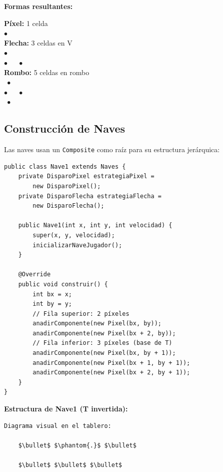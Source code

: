 \documentclass[12pt]{article}
\begin{document}
\textbf{Formas resultantes:}

\begin{center}
    \textbf{Píxel:} 1 celda\\
    $\bullet$\\[0.2cm]
    
    \textbf{Flecha:} 3 celdas en V\\
    $\bullet$\\
    $\bullet$ $\quad$ $\bullet$\\[0.2cm]
    
    \textbf{Rombo:} 5 celdas en rombo\\
    $\phantom{.}\bullet$\\
    $\bullet$ $\quad$ $\bullet$\\
    $\phantom{.}\bullet$\\
\end{center}

\subsection{Construcción de Naves}

Las naves usan un \texttt{Composite} como raíz para su estructura jerárquica:

\begin{lstlisting}
public class Nave1 extends Naves {
    private DisparoPixel estrategiaPixel = 
        new DisparoPixel();
    private DisparoFlecha estrategiaFlecha = 
        new DisparoFlecha();
    
    public Nave1(int x, int y, int velocidad) {
        super(x, y, velocidad);
        inicializarNaveJugador();
    }
    
    @Override
    public void construir() {
        int bx = x;
        int by = y;
        // Fila superior: 2 píxeles
        anadirComponente(new Pixel(bx, by));
        anadirComponente(new Pixel(bx + 2, by));
        // Fila inferior: 3 píxeles (base de T)
        anadirComponente(new Pixel(bx, by + 1));
        anadirComponente(new Pixel(bx + 1, by + 1));
        anadirComponente(new Pixel(bx + 2, by + 1));
    }
}
\end{lstlisting}

\textbf{Estructura de Nave1 (T invertida):}

\begin{lstlisting}
Diagrama visual en el tablero:
    
    $\bullet$ $\phantom{.}$ $\bullet$
    
    $\bullet$ $\bullet$ $\bullet$
\end{lstlisting}
\end{document}
